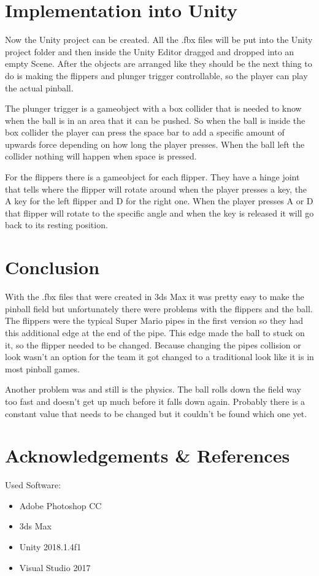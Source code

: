 \documentclass[11.5pt,oneside,a4paper]{scrartcl}
\newcounter{ct}
\begin{document}
\section{Implementation into Unity}
Now the Unity project can be created. All the .fbx files will be put into the Unity project folder and then inside the Unity Editor dragged and dropped into an empty Scene. After the objects are arranged like they should be the next thing to do is making the flippers and plunger trigger controllable, so the player can play the actual pinball.

The plunger trigger is a gameobject with a box collider that is needed to know when the ball is in an area that it can be pushed. So when the ball is inside the box collider the player can press the space bar to add a specific amount of upwards force depending on how long the player presses. When the ball left the collider nothing will happen when space is pressed.

For the flippers there is a gameobject for each flipper. They have a hinge joint that tells where the flipper will rotate around when the player presses a key, the A key for the left flipper and D for the right one. When the player presses A or D that flipper will rotate to the specific angle and when the key is released it will go back to its resting position.

\section{Conclusion}
With the .fbx files that were created in 3ds Max it was pretty easy to make the pinball field but unfortunately there were problems with the flippers and the ball.
The flippers were the typical Super Mario pipes in the first version so they had this additional edge at the end of the pipe. This edge made the ball to stuck on it, so the flipper needed to be changed. Because changing the pipes collision or look wasn't an option for the team it got changed to a traditional look like it is in most pinball games.

Another problem was and still is the physics. The ball rolls down the field way too fast and doesn't get up much before it falls down again. Probably there is a constant value that needs to be changed but it couldn't be found which one yet.

\section{Acknowledgements \& References}
Used Software:
\begin{itemize}
\item Adobe Photoshop CC
\item 3ds Max
\item Unity 2018.1.4f1
\item Visual Studio 2017
\end{itemize}
\end{document}
